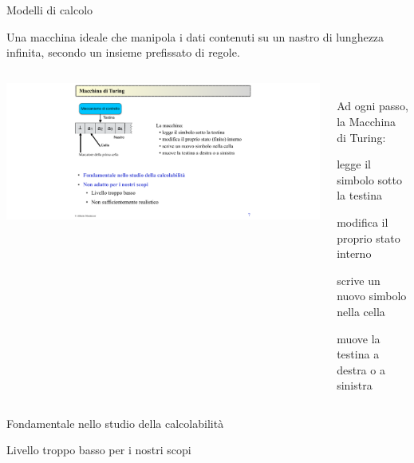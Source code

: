 \begin{frame}{Modelli di calcolo}
	
\begin{myboxtitle}
Una macchina ideale che manipola i dati contenuti su un nastro di lunghezza
infinita, secondo un insieme prefissato di regole.
\begin{columns}[T]
\begin{column}{0.28\textwidth}
\includegraphics[width=\textwidth]{turing.pdf}
\end{column}
\begin{column}{0.58\textwidth}
~\\
Ad ogni passo, la Macchina di Turing:
\BI
\item legge il simbolo sotto la testina
\item modifica il proprio stato interno
\item scrive un nuovo simbolo nella cella
\item muove la testina a destra o a sinistra
\EI
\end{column}
\end{columns}
\end{myboxtitle}

\smallskip	
\BI
\item Fondamentale nello studio della calcolabilità
\item Livello troppo basso per i nostri scopi
\EI
\end{frame}

